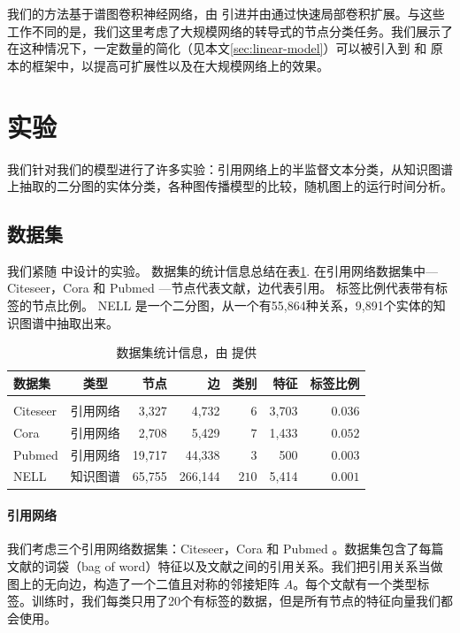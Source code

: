 \documentclass{article} %
\begin{document}
我们的方法基于谱图卷积神经网络，由 \cite{bruna2014spectral} 引进并由\cite{defferrard2016convolutional}通过快速局部卷积扩展。与这些工作不同的是，我们这里考虑了大规模网络的转导式的节点分类任务。我们展示了在这种情况下，一定数量的简化（见本文\ref{sec:linear-model}）可以被引入到\cite{bruna2014spectral} 和 \cite{defferrard2016convolutional} 原本的框架中，以提高可扩展性以及在大规模网络上的效果。

\section{实验}
我们针对我们的模型进行了许多实验：引用网络上的半监督文本分类，从知识图谱上抽取的二分图的实体分类，各种图传播模型的比较，随机图上的运行时间分析。


\subsection{数据集}
\label{sec:datasets}
我们紧随 \cite{yang2016revisiting} 中设计的实验。 数据集的统计信息总结在表\ref{tab:datasets}. 在引用网络数据集中---Citeseer，Cora 和 Pubmed \citep{sen2008collective}---节点代表文献，边代表引用。 标签比例代表带有标签的节点比例。 NELL \citep{carlson2010toward, yang2016revisiting} 是一个二分图，从一个有55,864种关系，9,891个实体的知识图谱中抽取出来。

\begin{table}[htp]
\centering
\caption{\label{tab:datasets}数据集统计信息，由 \cite{yang2016revisiting}提供}
\begin{tabular}{l c r r r r r}
\textbf{数据集} & \textbf{类型} & \textbf{节点} & \textbf{边} & \textbf{类别} & \textbf{特征} & \textbf{标签比例}  \\[0.05em]\hline \\[-0.8em]
Citeseer & 引用网络 & 3,327 & 4,732 & $6$ & 3,703 & $0.036$ \\
Cora & 引用网络 & 2,708 & 5,429 & $7$ & 1,433 & $0.052$ \\
Pubmed & 引用网络& 19,717 & 44,338 & $3$ & 500 & $0.003$ \\
NELL & 知识图谱 & 65,755 & 266,144 & $210$ & 5,414 & $0.001$ \\
\end{tabular}
\end{table}

\paragraph{引用网络} 我们考虑三个引用网络数据集：Citeseer，Cora 和 Pubmed \citep{sen2008collective}。数据集包含了每篇文献的词袋（bag of word）特征以及文献之间的引用关系。我们把引用关系当做图上的无向边，构造了一个二值且对称的邻接矩阵 $A$。每个文献有一个类型标签。训练时，我们每类只用了20个有标签的数据，但是所有节点的特征向量我们都会使用。
\end{document}
